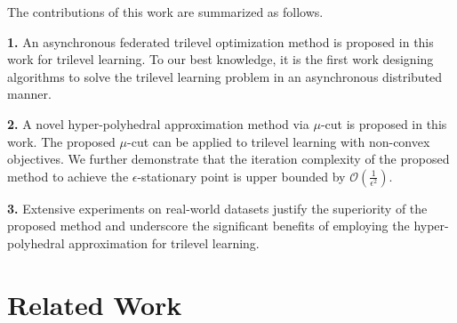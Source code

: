 \documentclass[letterpaper]{article} %
\begin{document}

The contributions of this work are summarized as follows.

\textbf{1.} An asynchronous federated trilevel optimization method is proposed in this work for trilevel learning. To our best knowledge, it is the first work designing algorithms to solve the trilevel learning problem in an asynchronous distributed manner.


\textbf{2.} A novel hyper-polyhedral approximation method via  $\mu$-cut is proposed in this work. The proposed $\mu$-cut can be applied to trilevel learning with non-convex objectives. We further demonstrate that the iteration complexity of the proposed method to achieve the $\epsilon$-stationary point is upper bounded by $\mathcal{O}(\frac{1}{\epsilon^2})$.


\textbf{3.} Extensive experiments on real-world datasets justify the superiority of the proposed method and underscore the significant benefits of employing the hyper-polyhedral approximation for trilevel learning.

\section{Related Work}
\end{document}
